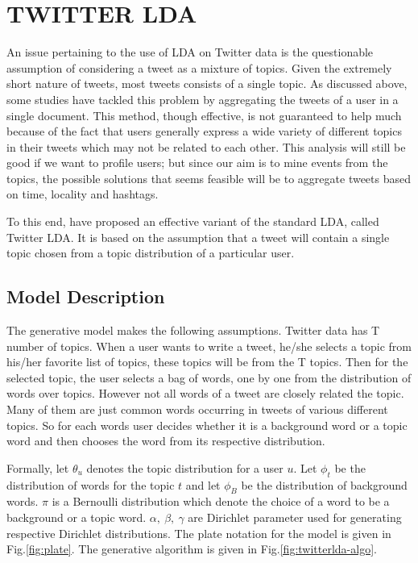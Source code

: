 
\section{\uppercase{Twitter LDA}}
An issue pertaining to the use of LDA on Twitter data is the questionable assumption of considering a tweet as a mixture of topics. Given the extremely short nature of tweets, most tweets consists of a single topic. As discussed above, some studies have tackled this problem by aggregating the tweets of a user in a single document. This method, though effective, is not guaranteed to help much because of the fact that users generally express a wide variety of different topics in their tweets which may not be related to each other. This analysis will still be good if we want to profile users; but since our aim is to mine events from the topics, the possible solutions that seems feasible will be to aggregate tweets based on time, locality and hashtags.

To this end, \cite{zhao2011comparing} have proposed an effective variant of the standard LDA, called Twitter LDA. It is based on the assumption that a tweet will contain a single topic chosen from a topic distribution of a particular user. 

\subsection{Model Description} 
The generative model makes the following assumptions. Twitter data has T number of topics. When a user wants to write a tweet, he/she selects a topic from his/her favorite list of topics, these topics will be from the T topics. Then for the selected topic, the user selects a bag of words, one by one from the distribution of words over topics. However not all words of a tweet are closely related the topic. Many of them are just common words occurring in tweets of various different topics. So for each words user decides whether it is a background word or a topic word and then chooses the word from its respective distribution.

Formally, let $\theta_u$ denotes the topic distribution for a user $u$. Let $\phi_t$ be the distribution of words for the topic $t$ and let $\phi_B$ be the distribution of background words. $\pi$ is a Bernoulli distribution which denote the choice of a word to be a background or a topic word. $\alpha,~\beta,~\gamma$ are Dirichlet parameter used for generating respective Dirichlet distributions. The plate notation for the model is given in Fig.\ref{fig:plate}. The generative algorithm is given in Fig.\ref{fig:twitterlda-algo}.

